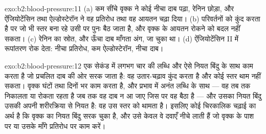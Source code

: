 \begin{solution}{exo:b2:blood-pressure:11}
(a) कम सींचे वृक्क ने कोई नीचा दाब पढ़ा, रेनिन छोड़ा,
और ऐंजियोटेंसिन तथा ऐल्डोस्टेरॉन ने वह प्रतिरोध तथा वह
आयतन चढ़ा दिया। (b)  परिवर्तनों को कुंद करता है पर जो भी
स्तर बना रहे उसी पर पुनः बैठ जाता है, और वृक्क के आयतन रोकने को बदल नहीं सकता।
(c) रेनिन का स्रोत, और ऊँचा दाब माँगता अंग,
जा चुका था। (d) ऐंजियोटेंसिन II में रूपांतरण रोक देता: नीचा
प्रतिरोध, कम ऐल्डोस्टेरॉन, नीचा दाब।
\end{solution}

\begin{solution}{exo:b2:blood-pressure:12}
 एक सेकंड में लगभग चार की लब्धि और ऐसे नियत
बिंदु के साथ काम करता है जो प्रचलित दाब की ओर सरक जाता है: वह उतार-चढ़ाव कुंद करता है
और कोई स्तर थाम नहीं सकता। वृक्क घंटों तथा दिनों भर काम करता है, और
प्रभाव में अनंत लब्धि के साथ --- वह तब तक निकालता या रोकता रहता है जब तक
वह दाब न आ जाए जिस पर वह बैठा है --- और उसका नियत बिंदु उसकी अपनी
शरीरक्रिया से नियत है: वह उस स्तर को थामता है। इसलिए कोई चिरकालिक चढ़ाई
का अर्थ है कि वृक्क का नियत बिंदु सरक चुका है, और उसे केवल वे दवाएँ नीचे लाती हैं जो
वृक्क के पाश पर या उसके माँगे प्रतिरोध पर काम करें।
\end{solution}

